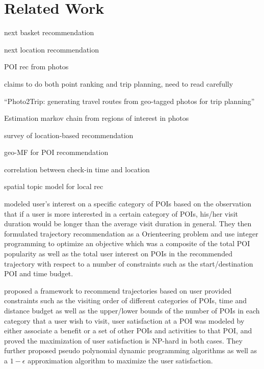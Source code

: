 
\section{Related Work}
\label{relatedwork}

next basket recommendation~\cite{fpmc10}

next location recommendation~\cite{ijcai13}

POI rec from photos~\cite{shi2011personalized}

\cite{lu2012personalized} claims to do both point ranking and trip planning, need to read carefully

``Photo2Trip: generating travel routes from geo-tagged photos for trip planning''~\cite{lu2010photo2trip}

Estimation markov chain from regions of interest in photos~\cite{zheng2012patterns}

survey of location-based recommendation~\cite{bao2015recommendations}

geo-MF for POI recommendation~\cite{lian2014geomf}

correlation between check-in time and location~\cite{gao2013temporal}

spatial topic model for local rec~\cite{hu2013spatialtopic}

\cite{ijcai15} modeled user's interest on a specific category of POIs based on the observation that if a user is more interested in a 
certain category of POIs, his/her visit duration would be longer than the average visit duration in general.
They then formulated trajectory recommendation as a Orienteering problem and use integer programming to optimize an objective
which was a composite of the total POI popularity as well as the total user interest on POIs in the recommended trajectory 
with respect to a number of constraints such as the start/destination POI and time budget.

\cite{wsdm14} proposed a framework to recommend trajectories based on user provided constraints such as the visiting order of different 
categories of POIs, time and distance budget as well as the upper/lower bounds of the number of POIs in each category that a user wish 
to visit, user satisfaction at a POI was modeled by either associate a benefit or a set of other POIs and activities to that POI,
and proved the maximization of user satisfaction is NP-hard in both cases. 
They further proposed pseudo polynomial dynamic programming algorithms as well as 
a $1-\epsilon$ approximation algorithm to maximize the user satisfaction.

